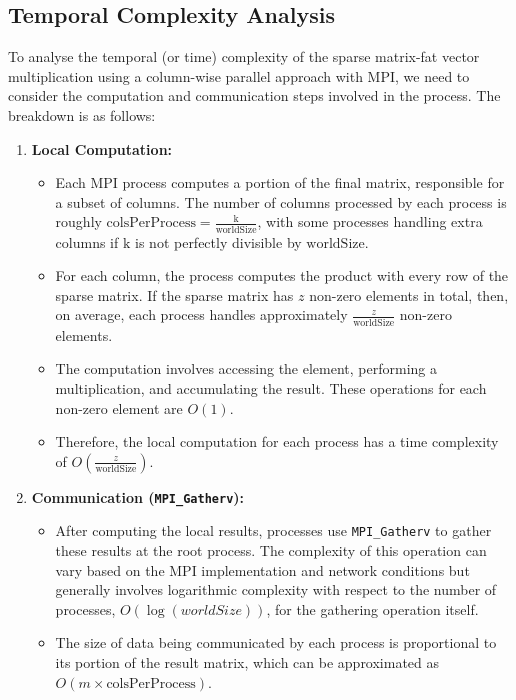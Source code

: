 \documentclass[12pt,oneside]{book} %
\begin{document}
\subsection{Temporal Complexity Analysis}

To analyse the temporal (or time) complexity of the sparse matrix-fat vector
multiplication using a column-wise parallel approach with MPI, we need to
consider the computation and communication steps involved in the process. The
breakdown is as follows:

\begin{enumerate}
    \item \textbf{Local Computation:}
          \begin{itemize}
              \item Each MPI process computes a portion of the final matrix, responsible for a
                    subset of columns. The number of columns processed by each process is roughly
                    \( \text{colsPerProcess} = \frac{\text{k}}{\text{worldSize}} \), with some
                    processes handling extra columns if \( \text{k} \) is not perfectly divisible
                    by \( \text{worldSize} \).
              \item For each column, the process computes the product with every row of the sparse
                    matrix. If the sparse matrix has \( z \) non-zero elements in total, then, on
                    average, each process handles approximately \( \frac{z}{\text{worldSize}} \)
                    non-zero elements.
              \item The computation involves accessing the element, performing a multiplication,
                    and accumulating the result. These operations for each non-zero element are \(
                    O(1) \).
              \item Therefore, the local computation for each process has a time complexity of \(
                    O\left(\frac{z}{\text{worldSize}}\right) \).
          \end{itemize}

    \item \textbf{Communication (\texttt{MPI\_Gatherv}):}
          \begin{itemize}
              \item After computing the local results, processes use \texttt{MPI\_Gatherv} to
                    gather these results at the root process. The complexity of this operation can
                    vary based on the MPI implementation and network conditions but generally
                    involves logarithmic complexity with respect to the number of processes,
                    \(O(\log(worldSize))\), for the gathering operation itself.
              \item The size of data being communicated by each process is proportional to its
                    portion of the result matrix, which can be approximated as \(O(m \times
                    \text{colsPerProcess})\).
          \end{itemize}


\end{enumerate}
\end{document}
